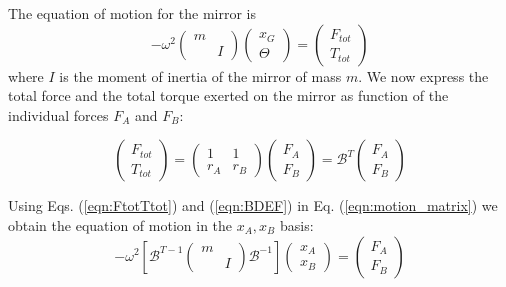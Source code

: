 The equation of motion for the mirror is
\begin{equation}
\label{eqn:motion_matrix}
-\omega^2
\begin{pmatrix}
m &  \\ & I
\end{pmatrix}
 \begin{pmatrix}
x_G\\ \Theta
\end{pmatrix}
= 
\begin{pmatrix}
F_{tot}\\ T_{tot}
\end{pmatrix}
\end{equation}
where $I$ is the moment of inertia of the mirror of mass $m$. We now express the total force and the total torque exerted on the mirror
as function of the individual forces $F_A$ and $F_B$:

\begin{equation}
\label{eqn:FtotTtot}
\begin{pmatrix}
F_{tot} \\ T_{tot}
\end{pmatrix}
=
 \begin{pmatrix}
1& 1\\r_A& r_B
\end{pmatrix} 
\begin{pmatrix}
F_A\\ F_B
\end{pmatrix}
=
\mathcal{B}^{T}
\begin{pmatrix}
F_A\\ F_B
\end{pmatrix}
\end{equation}

Using Eqs. (\ref{eqn:FtotTtot}) and (\ref{eqn:BDEF}) in Eq. (\ref{eqn:motion_matrix}) we obtain the equation of motion in the ${x_A,x_B}$ basis:
\begin{equation}
\label{eqn:M}
-\omega^2
\left[
\mathcal{B}^{T-1}
\begin{pmatrix}
m &  \\ & I
\end{pmatrix}
\mathcal{B}^{-1}
\right ]
 \begin{pmatrix}
x_A\\ x_B
\end{pmatrix} 
=
\begin{pmatrix}
F_{A}\\ F_{B}
\end{pmatrix}
\end{equation}

